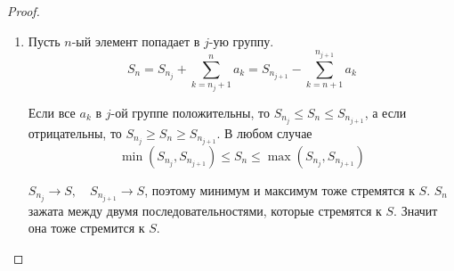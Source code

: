 \documentclass[../main.tex]{subfiles}
\begin{document}
\begin{proof}
\begin{enumerate}
        \item Пусть \( n\)-ый элемент попадает в \( j\)-ую группу.
        \[ S_n = S_{n_j}+ \sum\limits_{ k=n_j+1}^{ n} a_k = S_{n_{j+1}}- \sum\limits_{ k=n+1}^{ n_{j+1}} a_k\]
        \par Если все \( a_k\) в \( j\)-ой группе положительны, то \( S_{n_j} \leq S_n \leq S_{n_{j+1}}\), а если отрицательны, то \( S_{n_j} \geq S_n \geq S_{n_{j+1}}\). В любом случае 
        \[ \min\limits_{ } \left( S_{n_j}, S_{n_{j+1}}\right) \leq S_n \leq \max\limits_{ } \left( S_{n_j}, S_{n_{j+1}}\right) \]
        \par \( S_{n_j} \longrightarrow S,\quad S_{n_{j+1}} \longrightarrow S\), поэтому минимум и максимум тоже стремятся к \( S\). \( S_n\) зажата между двумя последовательностями, которые стремятся к \( S\). Значит она тоже стремится к \( S\).
    \end{enumerate}
\end{proof}
\end{document}
